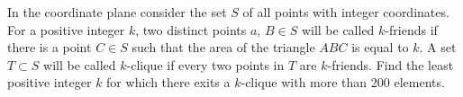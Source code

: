 In the coordinate plane consider the set $ S$ of all points with integer coordinates. For a positive integer $ k$,  two distinct points $ a$,  $ B\in S$ will be called $ k$-friends if there is a point $ C\in S$ such that the area of the triangle $ ABC$ is equal to $ k$. A set $ T\subset S$ will be called $ k$-clique if every two points in $ T$ are $ k$-friends. Find the least positive integer $ k$ for which there exits a $ k$-clique with more than 200 elements.